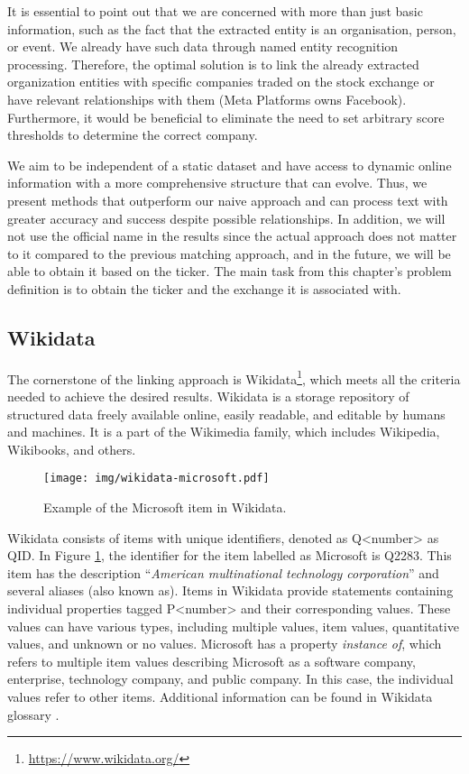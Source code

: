 It is essential to point out that we are concerned with more than just basic information, such as the fact that the extracted entity is an organisation, person, or event. We already have such data through named entity recognition processing. Therefore, the optimal solution is to link the already extracted organization entities with specific companies traded on the stock exchange or have relevant relationships with them (Meta Platforms owns Facebook). Furthermore, it would be beneficial to eliminate the need to set arbitrary score thresholds to determine the correct company.

We aim to be independent of a static dataset and have access to dynamic online information with a more comprehensive structure that can evolve. Thus, we present methods that outperform our naive approach and can process text with greater accuracy and success despite possible relationships. In addition, we will not use the official name in the results since the actual approach does not matter to it compared to the previous matching approach, and in the future, we will be able to obtain it based on the ticker. The main task from this chapter's problem definition is to obtain the ticker and the exchange it is associated with.

\subsection{Wikidata}
\label{subsec:wikidata}
The cornerstone of the linking approach is Wikidata\footnote{\href{https://www.wikidata.org/}{https://www.wikidata.org/}}, which meets all the criteria needed to achieve the desired results. Wikidata is a storage repository of structured data freely available online, easily readable, and editable by humans and machines. It is a part of the Wikimedia family, which includes Wikipedia, Wikibooks, and others. 

\begin{figure}[ht]
    \centering
    \texttt{[image: img/wikidata-microsoft.pdf]}
    \caption{Example of the Microsoft item in Wikidata.}
    \label{fig:wikidata-microsoft}
\end{figure}

Wikidata consists of items with unique identifiers, denoted as Q<number> as QID. In Figure \ref{fig:wikidata-microsoft}, the identifier for the item labelled as Microsoft is Q2283. This item has the description ``\textit{American multinational technology corporation}'' and several aliases (also known as). Items in Wikidata provide statements containing individual properties tagged P<number> and their corresponding values. These values can have various types, including multiple values, item values, quantitative values, and unknown or no values. Microsoft has a property \textit{instance of}, which refers to multiple item values describing Microsoft as a software company, enterprise, technology company, and public company. In this case, the individual values refer to other items. Additional information can be found in Wikidata glossary \parencite{wikidata_glossary}.

